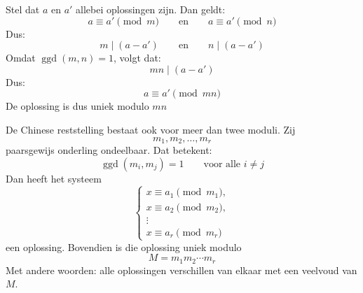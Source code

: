 
Stel dat $a$ en $a'$ allebei oplossingen zijn. Dan geldt:
\begin{equation*}
    a\equiv a' \pmod m \qquad \text{en} \qquad a\equiv a' \pmod n
\end{equation*}
Dus:
\begin{equation*}
    m\mid(a-a') \qquad \text{en} \qquad n\mid(a-a')
\end{equation*}
Omdat $\operatorname{ggd}(m,n)=1$, volgt dat:
\begin{equation*}
    mn\mid(a-a')
\end{equation*}
Dus:
\begin{equation*}
    a\equiv a' \pmod{mn}
\end{equation*}
De oplossing is dus uniek modulo $mn$


De Chinese reststelling bestaat ook voor meer dan twee moduli. Zij
\begin{equation*}
    m_1,m_2,\dots,m_r
\end{equation*}
paarsgewijs onderling ondeelbaar. Dat betekent:
\begin{equation*}
    \operatorname{ggd}(m_i,m_j)=1 \qquad \text{voor alle } i\neq j
\end{equation*}
Dan heeft het systeem
\begin{equation*}
    \begin{cases}
        x\equiv a_1 \pmod {m_1},\\
        x\equiv a_2 \pmod {m_2},\\
        \vdots\\
        x\equiv a_r \pmod {m_r}
    \end{cases}
\end{equation*}
een oplossing. Bovendien is die oplossing uniek modulo
\begin{equation*}
    M=m_1m_2\cdots m_r
\end{equation*}
Met andere woorden: alle oplossingen verschillen van elkaar met een veelvoud van $M$.

